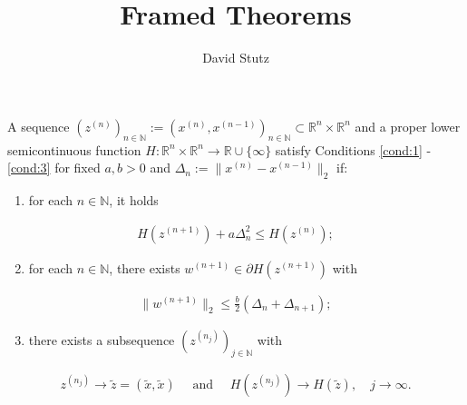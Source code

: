 \documentclass[11pt]{article}
\title{Framed Theorems}
\author{David Stutz}
\begin{document}
\maketitle

\begin{definitionmd}
	A sequence $(z^{(n)})_{n \in \mathbb{N}} := (x^{(n)}, x^{(n - 1)})_{n \in \mathbb{N}} \subset \mathbb{R}^{n} \times \mathbb{R}^n$ and a proper lower semicontinuous function $H : \mathbb{R}^{n} \times \mathbb{R}^n \rightarrow \mathbb{R} \cup \{\infty\}$ satisfy Conditions \ref{cond:1} - \ref{cond:3} for fixed $a,b > 0$ and $\Delta_n := \|x^{(n)} - x^{(n - 1)}\|_2$ if:
	\begin{enumerate}[label=(H\arabic*)]
		\item for each $n \in \mathbb{N}$, it holds\label{cond:1}
	\end{enumerate}
	\begin{align}
		H(z^{(n + 1)}) + a\Delta_n^2 \leq H(z^{(n)});
	\end{align}
	\begin{enumerate}[label=(H\arabic*)]
		\setcounter{enumi}{1}
		\item for each $n \in \mathbb{N}$, there exists $w^{(n + 1)} \in \partial H(z^{(n + 1)})$ with\label{cond:2}
	\end{enumerate}
	\begin{align}
		\|w^{(n + 1)}\|_2 \leq \frac{b}{2}(\Delta_n + \Delta_{n + 1});
	\end{align}
	\begin{enumerate}[label=(H\arabic*)]
		\setcounter{enumi}{2}
		\item there exists a subsequence $(z^{(n_j)})_{j \in \mathbb{N}}$ with\label{cond:3}
	\end{enumerate}
	\begin{align}
		z^{(n_j)} \rightarrow \tilde{z} = (\tilde{x}, \tilde{x})\quad\text{ and }\quad H(z^{(n_j)}) \rightarrow H(\tilde{z}),\quad j \rightarrow \infty.
	\end{align}\label{def:conditions}
\end{definitionmd}
\end{document}
